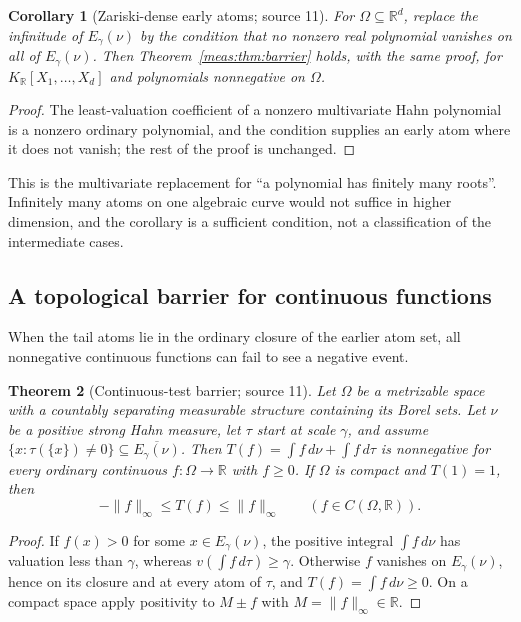 \documentclass[11pt]{article}
\numberwithin{equation}{section}
\newtheorem{theorem}{Theorem}[section]
\newtheorem{corollary}[theorem]{Corollary}
\theoremstyle{definition}
\theoremstyle{remark}
\newcommand{\R}{\mathbb R}
\newcommand{\KR}{K_{\R}}
\newcommand{\norm}[1]{\lVert#1\rVert}
\begin{document}
\begin{corollary}[Zariski-dense early atoms; source 11]\label{meas:cor:multivariate}
For $\Omega\subseteq\R^d$, replace the infinitude of $E_\gamma(\nu)$ by the
condition that no nonzero real polynomial vanishes on all of $E_\gamma(\nu)$.
Then Theorem~\ref{meas:thm:barrier} holds, with the same proof, for
$\KR[X_1,\ldots,X_d]$ and polynomials nonnegative on $\Omega$.
\end{corollary}
\begin{proof}
The least-valuation coefficient of a nonzero multivariate Hahn polynomial is a
nonzero ordinary polynomial, and the condition supplies an early atom where it
does not vanish; the rest of the proof is unchanged.
\end{proof}

This is the multivariate replacement for ``a polynomial has finitely many
roots''. Infinitely many atoms on one algebraic curve would not suffice in
higher dimension, and the corollary is a sufficient condition, not a
classification of the intermediate cases.

\subsection{A topological barrier for continuous functions}

When the tail atoms lie in the ordinary closure of the earlier atom set, all
nonnegative continuous functions can fail to see a negative event.

\begin{theorem}[Continuous-test barrier; source 11]\label{meas:thm:continuousbarrier}
Let $\Omega$ be a metrizable space with a countably separating measurable
structure containing its Borel sets. Let $\nu$ be a positive strong Hahn
measure, let $\tau$ start at scale $\gamma$, and assume
$\{x:\tau(\{x\})\ne0\}\subseteq\overline{E_\gamma(\nu)}$. Then
$T(f)=\int f\,d\nu+\int f\,d\tau$ is nonnegative for every ordinary continuous
$f:\Omega\to\R$ with $f\ge0$. If $\Omega$ is compact and $T(1)=1$, then
\begin{equation}\label{meas:eq:orderbound}
 -\norm f_\infty\le T(f)\le\norm f_\infty\qquad(f\in C(\Omega,\R)).
\end{equation}
\end{theorem}
\begin{proof}
If $f(x)>0$ for some $x\in E_\gamma(\nu)$, the positive integral $\int f\,d\nu$ has
valuation less than $\gamma$, whereas $v(\int f\,d\tau)\ge\gamma$. Otherwise $f$
vanishes on $E_\gamma(\nu)$, hence on its closure and at every atom of $\tau$, and
$T(f)=\int f\,d\nu\ge0$. On a compact space apply positivity to $M\pm f$ with
$M=\norm f_\infty\in\R$.
\end{proof}
\end{document}
